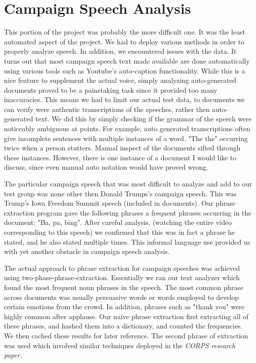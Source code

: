 \documentclass[12pt]{article}
\begin{document}
\section{Campaign Speech Analysis}
\par{This portion of the project was probably the more difficult one. It was the least automated aspect of the project. We had to deploy various methods in order to properly analyze speech. In addition, we encountered issues with the data. It turns out that most campaign speech text made available are done automatically using various tools such as Youtube's auto-caption functionality. While this is a nice feature to supplement the actual voice, simply analyzing auto-generated documents proved to be a painstaking task since it provided too many inaccuracies. This means we had to limit our actual test data, to documents we can verify were authentic transcriptions of the speeches, rather then auto-generated text. We did this by simply checking if the grammar of the speech were noticeably ambiguous at points. For example, auto generated transcriptions often give incomplete sentences with multiple instances of a word. "The the" occurring twice when a person stutters. Manual inspect of the documents sifted through these instances. However, there is one instance of a document I would like to discuss, since even manual auto notation would have proved wrong. }
\par{The particular campaign speech that was most difficult to analyze and add to our test group was none other then Donald Trumps's campaign speech. This was Trump's Iowa Freedom Summit speech (included in documents). Our phrase extraction program gave the following phrases a frequent phrases occurring in the document: "Ba, pa, bing". After careful analysis, (watching the entire video corresponding to this speech) we confirmed that this was in fact a phrase he stated, and he also stated multiple times. This informal language use provided us with yet another obstacle in campaign speech analysis. }
\par{The actual approach to phrase extraction for campaign speeches was achieved using two-phase-phrase-extraction. Essentially we ran our text analyzer which found the most frequent noun phrases in the speech. The most common phrase across documents was usually persuasive words or words employed to develop certain emotions from the crowd. In addition, phrases such as "thank you" were highly common after applause. Our naive phrase extraction first extracting all of these phrases, and hashed them into a dictionary, and counted the frequencies. We then cached these results for later reference. The second phrase of extraction was used which involved similar techniques deployed in the \it{CORPS} research paper. }
\end{document}
